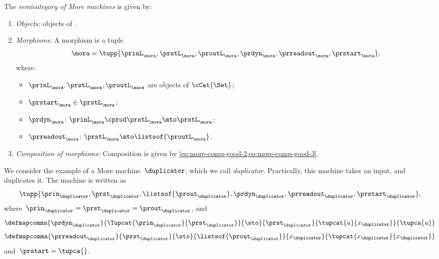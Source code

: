\begin{definition}[\More]
    \label{def:More}
    The \emph{semicategory of More machines} \More is given by:
    \begin{enumerate}
        \item \emph{Objects:} objects of \cCat{\Set}.
        \item \emph{Morphisms:}
              A morphism is a tuple
              \begin{equation}
                  \mora = \tupp{\prinL_{\mora},\prstL_{\mora}, \proutL_{\mora},\prdyn_{\mora},\prreadout_{\mora},\prstart_{\mora}},
              \end{equation}
              where:
              \begin{itemize}
                  \item $\prinL_{\mora},\prstL_{\mora}, \proutL_{\mora}$ are objects of $\cCat{\Set}$;
                  \item $\prstart_{\mora} \in \prstL_{\mora}$;
                  \item $ \prdyn_{\mora} \colon \prinL_{\mora} \cprod \prstL_{\mora} \mto \prstL_{\mora}$;
                  \item $ \prreadout_{\mora} \colon \prstL_{\mora}  \mto \listsof{\proutL_{\mora}}$.
              \end{itemize}
        \item \emph{Composition of morphisms:}
              Composition is given by \cref{eq:more-comp-good-2,eq:more-comp-good-3}.
    \end{enumerate}
\end{definition}



\begin{example}[Duplicator]
    We consider the example of a More machine~$\duplicator$, which we call \emph{duplicator}.
    Practically, this machine takes an input, and duplicates it.
    The machine is written as
    \begin{equation*}
        \tupp{\prin_{\duplicator},\prst_{\duplicator},\listsof{\prout_{\duplicator}},\prdyn_{\duplicator},\prreadout_{\duplicator},\prstart_{\duplicator}},
    \end{equation*}
    where~$\prin_{\duplicator}=\prst_{\duplicator}=\prout_\duplicator$, and
    \begin{equation*}
        \defmapcomma{\prdyn_\duplicator}
        {\Tupcat{\prin_\duplicator}{\prst_\duplicator}}
        {\sto}
        {\prst_\duplicator}
        {\tupcat{u}{x_\duplicator}}
        {\tupca{u}}
    \end{equation*}
    \begin{equation*}
        \defmapcomma{\prreadout_\duplicator}
        {\prst_\duplicator}
        {\sto}
        {\listsof{\prout_\duplicator}}
        {x_\duplicator}
        {\tupcat{x_\duplicator}{x_\duplicator}}
    \end{equation*}
    and~$\prstart=\tupca{}$.
\end{example}

